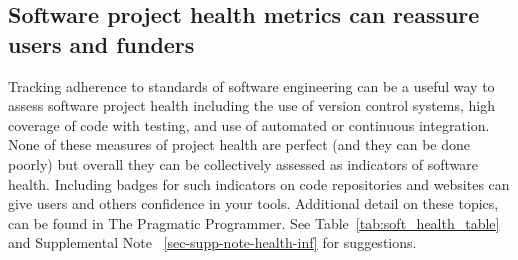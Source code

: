 \documentclass{article}
\begin{document}
\subsection{Software project health metrics can reassure users and funders}
Tracking adherence to standards of software engineering can be a useful way to assess software project health including the use of version control systems, high coverage of code with testing, and use of automated or continuous integration. None of these measures of project health are perfect (and they can be done poorly) but overall they can be collectively assessed as indicators of software health. Including badges for such indicators on code repositories and websites can give users and others confidence in your tools.  Additional detail on these topics, can be found in The Pragmatic Programmer\cite{thomas_pragmatic_2019}. See Table~\ref{tab:soft_health_table} and Supplemental Note ~\ref{sec-supp-note-health-inf} for suggestions.
\end{document}
